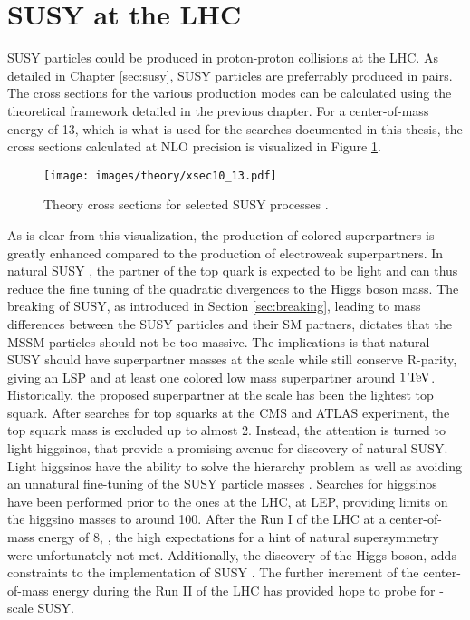 \section{SUSY at the LHC}
\noindent\justify
SUSY particles could be produced in proton-proton collisions at the LHC. 
As detailed in Chapter \ref{sec:susy}, SUSY particles are preferrably produced in pairs. 
The cross sections for the various production modes can be calculated using the theoretical framework detailed in the previous chapter. 
For a center-of-mass energy of 13\TeV, which is what is used for the searches documented in this thesis, the cross sections calculated at NLO precision is visualized in Figure \ref{fig:xsecs}. 
\begin{figure}[htbp!]
\begin{center}
    \texttt{[image: images/theory/xsec10\_13.pdf]}
    \caption{Theory cross sections for selected SUSY processes \cite{Borschensky:2014cia}.}
\label{fig:xsecs}
\end{center}
\end{figure}
As is clear from this visualization, the production of colored superpartners is greatly enhanced compared to the production of electroweak superpartners. 
In natural SUSY \cite{Dimopoulos:1995mi,Barbieri:2009ev,Papucci:2011wy}, the partner of the top quark is expected to be light and can thus reduce the fine tuning of the quadratic divergences to the Higgs boson mass.
The breaking of SUSY, as introduced in Section \ref{sec:breaking}, leading to mass differences between the SUSY particles and their SM partners, dictates that the MSSM particles should not be too massive. 
The implications is that natural SUSY should have superpartner masses at the \TeV scale while still conserve R-parity, giving an LSP and at least one colored low mass superpartner around $1\,\text{Te\hspace{-.08em}V}$. 
Historically, the proposed superpartner at the \TeV scale has been the lightest top squark. 
After searches for top squarks at the CMS and ATLAS experiment, the top squark mass is excluded up to almost 2\TeV. 
Instead, the attention is turned to light higgsinos, that provide a promising avenue for discovery of natural SUSY. 
Light higgsinos have the ability to solve the hierarchy problem as well as avoiding an unnatural fine-tuning of the SUSY particle masses \cite{Han:2014kaa,Giudice:2010wb}. 
Searches for higgsinos have been performed prior to the ones at the LHC, at LEP, providing limits on the higgsino masses to around 100\GeV. 
After the Run I of the LHC at a center-of-mass energy of 8\TeV, \cite{Kraml:2012er,Autermann:2016les}, the high expectations for a hint of natural supersymmetry were unfortunately not met. 
Additionally, the discovery of the Higgs boson, adds constraints to the implementation of SUSY \cite{Arbey:2011ab}. 
The further increment of the center-of-mass energy during the Run II of the LHC has provided hope to probe for \TeV-scale SUSY.
